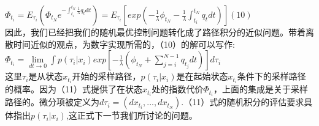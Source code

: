 \documentclass[2pt,a4paper]{article}
\begin{document}
$\Phi_{t_i}=E_{\tau_i}(\Phi_{t_N}e^{-\int _{t_i}^{t_N} \frac{1}{\lambda} q_t \mathbf{d}t})=E_{\tau_i}[exp(-\frac{1}{\lambda}\phi_{t_N}-\frac{1}{\lambda} \int _{t_i} ^{t_N}q_t dt)] (10)$\\
因此，我们已经把我们的随机最优控制问题转化成了路径积分的近似问题。带着离散时间近似的观点，为数字实现所需的，（10）的解可以写作:\\
$\Phi_{t_i}=\mathop{lim}\limits_{dt \rightarrow 0} \int p(\tau_i|x_i)exp[-\frac{1}{\lambda}(\phi_{t_N}+\sum _{j=i}^{N-1}q_{t_j}dt)]d \tau_i$\\
这里$\tau_i$是从状态$x_{t_i}$开始的采样路径，$p(\tau_i|x_i)$是在起始状态$x_{t_i}$条件下的采样路径的概率。因为（11）式提供了在状态$x_{t_i}$处的指数代价$\Phi_{t_i}$，上面的集成是关于采样路径的。微分项被定义为$d\tau_i=(dx_{t_i},...,dx_{t_N})$.（11）式的随机积分的评估要求具体指出$p(\tau_i|x_i)$,这正式下一节我们所讨论的问题。
\end{document}
